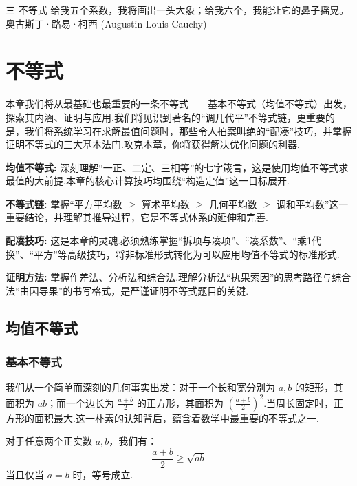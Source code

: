 \makechapteropener
	{三} 
	{不等式}
	{给我五个系数，我将画出一头大象；给我六个，我能让它的鼻子摇晃。} 
	{奥古斯丁·路易·柯西 (Augustin-Louis Cauchy)}
	
	\chapter{不等式}
	
	\lettrine{本}{章我们}将从最基础也最重要的一条不等式——基本不等式（均值不等式）出发，探索其内涵、证明与应用.我们将见识到著名的“调几代平”不等式链，更重要的是，我们将系统学习在求解最值问题时，那些令人拍案叫绝的“配凑”技巧，并掌握证明不等式的三大基本法门.攻克本章，你将获得解决优化问题的利器.
	
\begin{introduction}[知识概括]
	\item \textbf{均值不等式:} 深刻理解“一正、二定、三相等”的七字箴言，这是使用均值不等式求最值的大前提.本章的核心计算技巧均围绕“构造定值”这一目标展开.
	\item \textbf{不等式链:} 掌握“平方平均数 $\ge$ 算术平均数 $\ge$ 几何平均数 $\ge$ 调和平均数”这一重要结论，并理解其推导过程，它是不等式体系的延伸和完善.
	\item \textbf{配凑技巧:} 这是本章的灵魂.必须熟练掌握“拆项与凑项”、“凑系数”、“乘1代换”、“平方”等高级技巧，将非标准形式转化为可以应用均值不等式的标准形式.
	\item \textbf{证明方法:} 掌握作差法、分析法和综合法.理解分析法“执果索因”的思考路径与综合法“由因导果”的书写格式，是严谨证明不等式题目的关键.
\end{introduction}
	
	\section{均值不等式}
	
	\subsection{基本不等式}
	
	我们从一个简单而深刻的几何事实出发：对于一个长和宽分别为 $a,b$ 的矩形，其面积为 $ab$；而一个边长为 $\frac{a+b}{2}$ 的正方形，其面积为 $(\frac{a+b}{2})^2$.当周长固定时，正方形的面积最大.这一朴素的认知背后，蕴含着数学中最重要的不等式之一.
	
	\begin{theorem}[基本不等式]
		对于任意两个正实数 $a, b$，我们有：
		\begin{equation}
			\frac{a+b}{2} \ge \sqrt{ab}
		\end{equation}
		当且仅当 $a=b$ 时，等号成立.
	\end{theorem}
	
